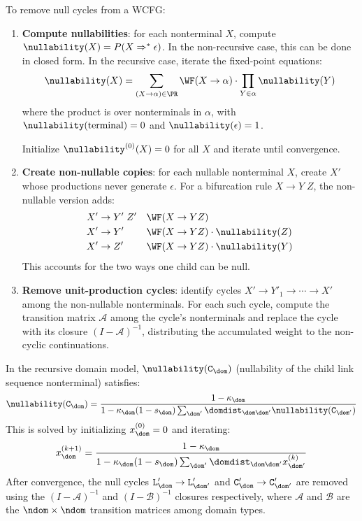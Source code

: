 \begin{definition}
To remove null cycles from a WCFG:
\begin{enumerate}
\item \textbf{Compute nullabilities}: for each nonterminal $X$,
  compute $\nullability(X) = P(X \Rightarrow^* \epsilon)$.
  In the non-recursive case, this can be done in closed form.
  In the recursive case, iterate the fixed-point equations:
  \begin{equation}
  \nullability(X) = \sum_{(X \to \alpha) \in \PR}
    \WF(X \to \alpha) \cdot \prod_{Y \in \alpha} \nullability(Y)
  \end{equation}
  where the product is over nonterminals in $\alpha$,
  with $\nullability(\text{terminal}) = 0$ and
  $\nullability(\epsilon) = 1$.

  Initialize $\nullability^{(0)}(X) = 0$ for all $X$
  and iterate until convergence.

\item \textbf{Create non-nullable copies}: for each nullable
  nonterminal $X$, create $X'$ whose productions never generate
  $\epsilon$.  For a bifurcation rule $X \to Y\;Z$,
  the non-nullable version adds:
  \begin{align*}
  X' &\to Y'\;Z' && \WF(X \to YZ) \\
  X' &\to Y' && \WF(X \to YZ) \cdot \nullability(Z) \\
  X' &\to Z' && \WF(X \to YZ) \cdot \nullability(Y)
  \end{align*}
  This accounts for the two ways one child can be null.

\item \textbf{Remove unit-production cycles}: identify cycles
  $X' \to Y'_1 \to \cdots \to X'$ among the non-nullable
  nonterminals.  For each such cycle, compute the transition
  matrix $\mathcal{A}$ among the cycle's nonterminals and replace
  the cycle with its closure $(I - \mathcal{A})^{-1}$,
  distributing the accumulated weight to the non-cyclic
  continuations.
\end{enumerate}
\end{definition}

\begin{example}
In the recursive domain model,
$\nullability(\texttt{C}_\dom)$ (nullability of the child
link sequence nonterminal) satisfies:
\[
\nullability(\texttt{C}_\dom) =
\frac{1 - \kappa_\dom}
{1 - \kappa_\dom (1-s_\dom) \sum_{\dom'}
  \domdist_{\dom\dom'} \nullability(\texttt{C}_{\dom'})}
\]
This is solved by initializing $x_\dom^{(0)} = 0$ and iterating:
\[
x_\dom^{(k+1)} =
\frac{1 - \kappa_\dom}
{1 - \kappa_\dom (1-s_\dom) \sum_{\dom'}
  \domdist_{\dom\dom'} x_{\dom'}^{(k)}}
\]
After convergence, the null cycles
$\texttt{L}'_\dom \to \texttt{L}'_{\dom'}$ and
$\texttt{C}'_\dom \to \texttt{C}'_{\dom'}$
are removed using the $(I - \mathcal{A})^{-1}$ and
$(I - \mathcal{B})^{-1}$ closures respectively,
where $\mathcal{A}$ and $\mathcal{B}$ are the
$\ndom \times \ndom$ transition matrices among domain types.
\end{example}

